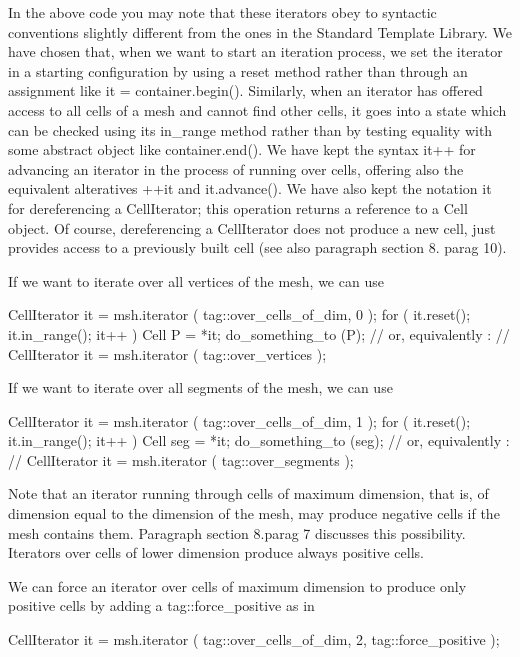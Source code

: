 In the above code you may note that these iterators obey to syntactic conventions
slightly different from the ones in the Standard Template Library.
We have chosen that, when we want to start an iteration process, we set the iterator in
a starting configuration by using a {\codett reset} method rather than through an assignment
like {\codett it = container.begin()}.
Similarly, when an iterator has offered access to all cells of a mesh and cannot find
other cells, it goes into a state which can be checked using its {\codett in\_range} method
rather than by testing equality with some abstract object like {\codett container.end()}.
We have kept the syntax {\codett it++} for advancing an iterator in the process of
running over cells, offering also the equivalent alteratives {\codett ++it} and
{\codett it.advance()}.
We have also kept the notation {\codett *it} for dereferencing a {\codett CellIterator};
this operation returns a reference to a {\codett Cell} object.
Of course, dereferencing a {\codett CellIterator} does not produce a new cell,
just provides access to a previously built cell (see also paragraph \numb section 8.\numb
parag 10).

If we want to iterate over all vertices of the mesh, we can use

\verbatim
   CellIterator it = msh.iterator ( tag::over_cells_of_dim, 0 );
   for ( it.reset(); it.in_range(); it++ )
   {  Cell P = *it;  do_something_to (P);  }
   // or, equivalently :
   // CellIterator it = msh.iterator ( tag::over_vertices );
\endverbatim

If we want to iterate over all segments of the mesh, we can use

\verbatim
   CellIterator it = msh.iterator ( tag::over_cells_of_dim, 1 );
   for ( it.reset(); it.in_range(); it++ )
   {  Cell seg = *it;  do_something_to (seg);  }
   // or, equivalently :
   // CellIterator it = msh.iterator ( tag::over_segments );
\endverbatim

Note that an iterator running through cells of maximum dimension, that is, of dimension equal
to the dimension of the mesh, may produce negative cells if the mesh contains them.
Paragraph \numb section 8.\numb parag 7 discusses this possibility.
Iterators over cells of lower dimension produce always positive cells.

We can force an iterator over cells of maximum dimension to produce only positive cells
by adding a {\codett tag::force\_positive} as in

\verbatim
   CellIterator it = msh.iterator ( tag::over_cells_of_dim, 2, tag::force_positive );
\endverbatim

